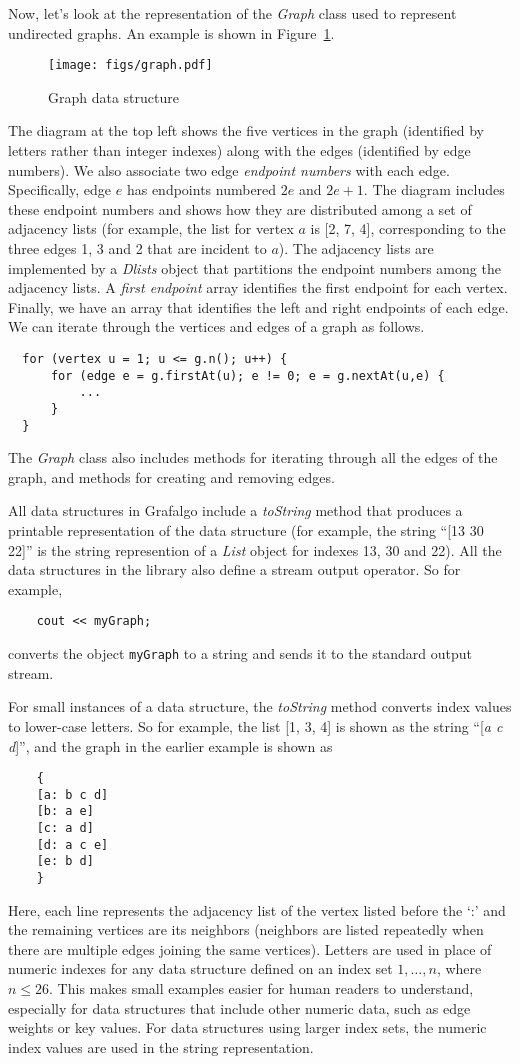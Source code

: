 \documentclass[11pt]{article}
\begin{document}
Now, let's look at the representation of the {\sl Graph} class used to represent
undirected graphs. 
An example is shown in Figure~\ref{graph}.
\begin{figure}[h]
\centerline{\texttt{[image: figs/graph.pdf]}}
\caption{Graph data structure}
\label{graph}
\end{figure}
The diagram at the top left shows the five vertices in the graph (identified by letters
rather than integer indexes) along with the edges (identified by edge numbers).
We also associate two edge {\sl endpoint numbers} with each edge. Specifically,
edge $e$ has endpoints numbered $2e$ and $2e+1$. The diagram includes these
endpoint numbers and shows how they are distributed among a set of
adjacency lists (for example, the list for vertex $a$ is [2, 7, 4], corresponding to the
three edges 1, 3 and 2 that are incident to $a$). The adjacency lists are implemented
by a {\sl Dlists} object that partitions the endpoint numbers among the adjacency lists.
A {\sl first endpoint} array identifies the first endpoint for each vertex.
Finally, we have an array that identifies the left and right endpoints of each edge.
We can iterate through the vertices and edges of a graph as follows.
\begin{verbatim}
  for (vertex u = 1; u <= g.n(); u++) {
      for (edge e = g.firstAt(u); e != 0; e = g.nextAt(u,e) {
          ...
      }
  }
\end{verbatim}
The {\sl Graph} class also includes methods for iterating through all the edges of the graph,
and methods for creating and removing edges.

All data structures in Grafalgo include a {\sl toString} method that produces a printable
representation of the data structure (for example, the string ``[13 30 22]'' is the string represention
of a {\sl List} object for indexes 13, 30 and 22). All the data structures in the library also define a
stream output operator. So for example,
\begin{verbatim}
    cout << myGraph;
\end{verbatim}
converts the object {\tt myGraph} to a string and sends it to the standard output stream.

For small instances of a data structure, the {\sl toString} method converts index values 
to lower-case letters. So for example, the list [1, 3, 4] is shown as the string ``[{\sl a c d}]'',
and the graph in the earlier example is shown as
\newpage
\begin{verbatim}
    {
    [a: b c d]
    [b: a e]
    [c: a d]
    [d: a c e]
    [e: b d]
    }
\end{verbatim}
Here, each line represents the adjacency list of the vertex listed before the `:' and the remaining
vertices are its neighbors (neighbors are listed repeatedly when there are multiple edges joining the same vertices).
Letters are used in place of numeric indexes for any data structure defined on an 
index set $1,\ldots,n$, where $n\leq 26$. 
This makes small examples easier for human readers
to understand, especially for data structures that include other numeric data,
such as edge weights or key values.
For data structures using larger index sets, the numeric index values
are used in the string representation. 
\end{document}
